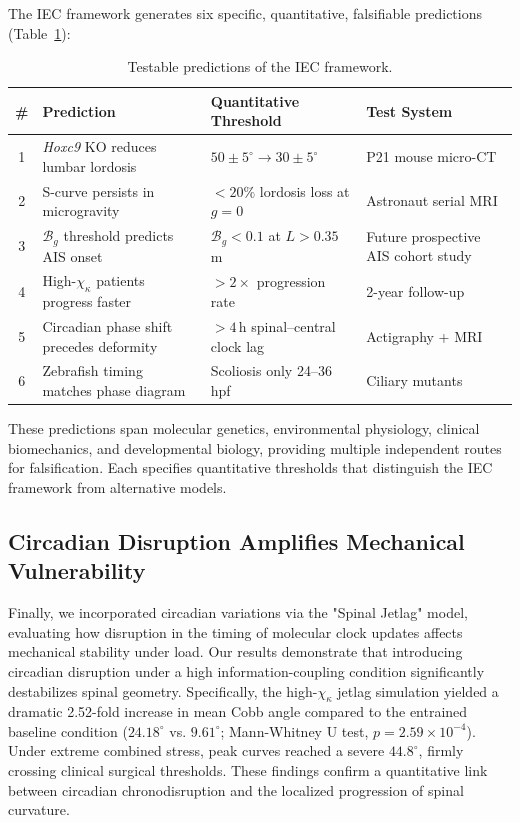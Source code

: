 The IEC framework generates six specific, quantitative, falsifiable predictions (Table~\ref{tab:predictions}):

\begin{table}[h!]
\centering
\caption{Testable predictions of the IEC framework.}
\label{tab:predictions}
\small
\begin{tabular}{clll}
\toprule
\textbf{\#} & \textbf{Prediction} & \textbf{Quantitative Threshold} & \textbf{Test System} \\
\midrule
1 & \textit{Hoxc9} KO reduces lumbar lordosis & $50 \pm 5^\circ \to 30 \pm 5^\circ$ & P21 mouse micro-CT \\
2 & S-curve persists in microgravity & $<20\%$ lordosis loss at $g = 0$ & Astronaut serial MRI \\
3 & $\mathcal{B}_g$ threshold predicts AIS onset & $\mathcal{B}_g < 0.1$ at $L > 0.35$\,m & Future prospective AIS cohort study \\
4 & High-$\chi_\kappa$ patients progress faster & $>2\times$ progression rate & 2-year follow-up \\
5 & Circadian phase shift precedes deformity & $>4$\,h spinal--central clock lag & Actigraphy + MRI \\
6 & Zebrafish timing matches phase diagram & Scoliosis only 24--36 hpf & Ciliary mutants \\
\bottomrule
\end{tabular}
\end{table}

These predictions span molecular genetics, environmental physiology, clinical biomechanics, and developmental biology, providing multiple independent routes for falsification. Each specifies quantitative thresholds that distinguish the IEC framework from alternative models.

\subsection{Circadian Disruption Amplifies Mechanical Vulnerability}
Finally, we incorporated circadian variations via the "Spinal Jetlag" model, evaluating how disruption in the timing of molecular clock updates affects mechanical stability under load. Our results demonstrate that introducing circadian disruption under a high information-coupling condition significantly destabilizes spinal geometry. Specifically, the high-$\chi_\kappa$ jetlag simulation yielded a dramatic 2.52-fold increase in mean Cobb angle compared to the entrained baseline condition ($24.18^\circ$ vs. $9.61^\circ$; Mann-Whitney U test, $p = 2.59\times 10^{-4}$). Under extreme combined stress, peak curves reached a severe $44.8^\circ$, firmly crossing clinical surgical thresholds. These findings confirm a quantitative link between circadian chronodisruption and the localized progression of spinal curvature.

